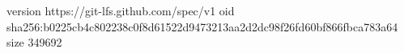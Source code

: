 version https://git-lfs.github.com/spec/v1
oid sha256:b0225cb4c802238c0f8d61522d9473213aa2d2dc98f26fd60bf866fbca783a64
size 349692
